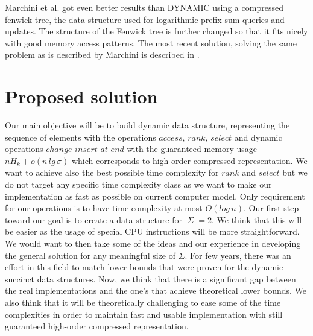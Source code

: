 Marchini et al. got even better results than DYNAMIC using a compressed fenwick tree\cite{marchini2020compact}, the data structure used for logarithmic prefix sum queries and updates\cite{fenwick1994new}. The structure of the Fenwick tree is further changed so that it fits nicely with good memory access patterns. The most recent solution, solving the same problem as is described by Marchini is described in \cite{pibiri2020rank}. 

\section{Proposed solution}

Our main objective will be to build dynamic data structure, representing the sequence of elements with the operations $access$, $rank$, $select$ and dynamic operations $change$ $insert\_at\_end$ with the guaranteed memory usage $nH_k+o(n\,lg\,\sigma)$ which corresponds to high-order compressed representation. We want to achieve also the best possible time complexity for $rank$ and $select$ but we do not target any specific time complexity class as we want to make our implementation as fast as possible on current computer model. Only requirement for our operations is to have time complexity at most $O(log\,n)$. Our first step toward our goal is to create a data structure for $|\Sigma|=2$. We think that this will be easier as the usage of special CPU instructions will be more straightforward. We would want to then take some of the ideas and our experience in developing the general solution for any meaningful size of $\Sigma$. For few years, there was an effort in this field to match lower bounds that were proven for the dynamic succinct data structures. Now, we think that there is a significant gap between the real implementations and the one's that achieve theoretical lower bounds. We also think that it will be theoretically challenging to ease some of the time complexities in order to maintain fast and usable implementation with still guaranteed high-order compressed representation.